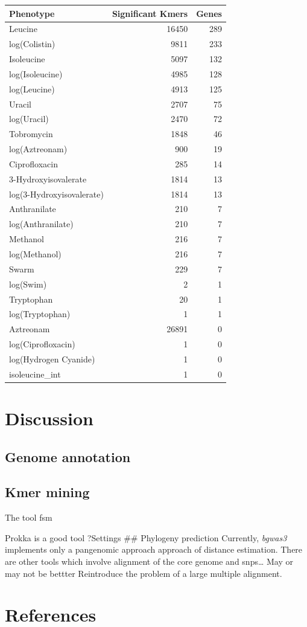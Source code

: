 \documentclass[]{article}
\begin{document}
\begin{longtable}[]{@{}lrr@{}}
\toprule
Phenotype & Significant Kmers & Genes\tabularnewline
\midrule
\endhead
Leucine & 16450 & 289\tabularnewline
log(Colistin) & 9811 & 233\tabularnewline
Isoleucine & 5097 & 132\tabularnewline
log(Isoleucine) & 4985 & 128\tabularnewline
log(Leucine) & 4913 & 125\tabularnewline
Uracil & 2707 & 75\tabularnewline
log(Uracil) & 2470 & 72\tabularnewline
Tobromycin & 1848 & 46\tabularnewline
log(Aztreonam) & 900 & 19\tabularnewline
Ciprofloxacin & 285 & 14\tabularnewline
3-Hydroxyisovalerate & 1814 & 13\tabularnewline
log(3-Hydroxyisovalerate) & 1814 & 13\tabularnewline
Anthranilate & 210 & 7\tabularnewline
log(Anthranilate) & 210 & 7\tabularnewline
Methanol & 216 & 7\tabularnewline
log(Methanol) & 216 & 7\tabularnewline
Swarm & 229 & 7\tabularnewline
log(Swim) & 2 & 1\tabularnewline
Tryptophan & 20 & 1\tabularnewline
log(Tryptophan) & 1 & 1\tabularnewline
Aztreonam & 26891 & 0\tabularnewline
log(Ciprofloxacin) & 1 & 0\tabularnewline
log(Hydrogen Cyanide) & 1 & 0\tabularnewline
isoleucine\_int & 1 & 0\tabularnewline
\bottomrule
\end{longtable}

\hypertarget{discussion}{%
\section{Discussion}\label{discussion}}

\hypertarget{genome-annotation-1}{%
\subsection{Genome annotation}\label{genome-annotation-1}}

\hypertarget{kmer-mining-1}{%
\subsection{Kmer mining}\label{kmer-mining-1}}

The tool fsm

Prokka is a good tool ?Settings \#\# Phylogeny prediction Currently,
\emph{bgwas3} implements only a pangenomic approach approach of distance
estimation. There are other tools which involve alignment of the core
genome and snps\ldots{} May or may not be bettter Reintroduce the
problem of a large multiple alignment.

\hypertarget{references}{%
\section{References}\label{references}}
\end{document}
